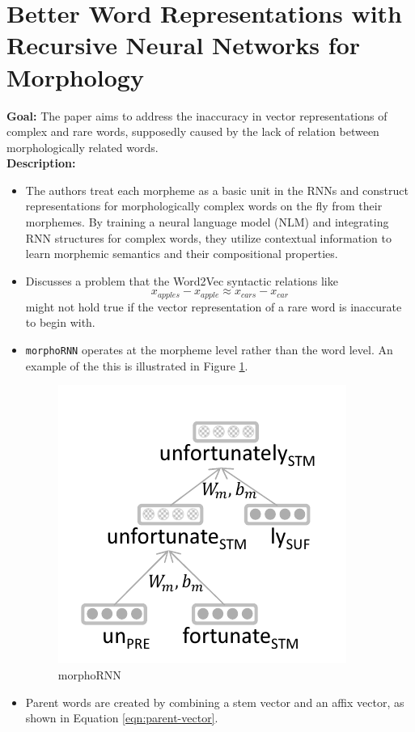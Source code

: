 \documentclass[11pt,a4paper]{article}
\begin{document}


\section{Better Word Representations with Recursive Neural Networks for Morphology} %
\label{sec:better_word_representations_with_recursive_neural_networks_for_morphology}

  \textbf{Goal:}
  The paper aims to address the inaccuracy in vector representations of complex and rare words, supposedly caused by the lack of relation between morphologically related words\cite{luong2013better}.\\

  \textbf{Description:}
  \begin{itemize}
    \item
    The authors treat each morpheme as a basic unit in the RNNs and construct representations for morphologically complex words on the fly from their morphemes. By training a neural language model (NLM) and integrating RNN structures for complex words, they utilize contextual information to learn morphemic semantics and their compositional properties.
    \item
    Discusses a problem that the Word2Vec syntactic relations like $$x_{apples} - x_{apple} \approx x_{cars} - x_{car}$$ might not hold true if the vector representation of a rare word is inaccurate to begin with.
    \item
    \texttt{morphoRNN} operates at the morpheme level rather than the word level. An example of the this is illustrated in Figure \ref{fig:rnn-morphology}.
    \begin{figure}[ht]
      \centering
      \includegraphics[width=.4\textwidth]{rnn-morphology}
      \caption{morphoRNN}
      \label{fig:rnn-morphology}
    \end{figure}
    \item
    Parent words are created by combining a stem vector and an affix vector, as shown in Equation \ref{eqn:parent-vector}.

\end{itemize}
\end{document}
